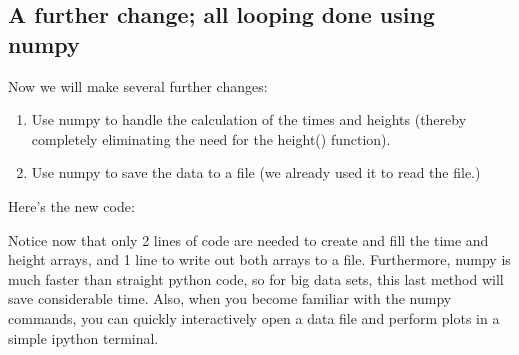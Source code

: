 \subsection{A further change; all looping done using numpy}
\label{subsec:prog2_np}
Now we will make several further changes:
\begin{enumerate}
	\item Use numpy to handle the calculation of the times and heights (thereby completely eliminating the need for the height() function). 
	\item Use numpy to save the data to a file (we already used it to read the file.)
\end{enumerate}
Here's the new code:

Notice now that only 2 lines of code are needed to create and fill the time and height arrays, and 1 line to write out both arrays to a file. Furthermore, numpy is much faster than straight python code, so for big data sets, this last method will save considerable time. Also, when you become familiar with the numpy commands, you can quickly interactively open a data file and perform plots in a simple ipython terminal. 


